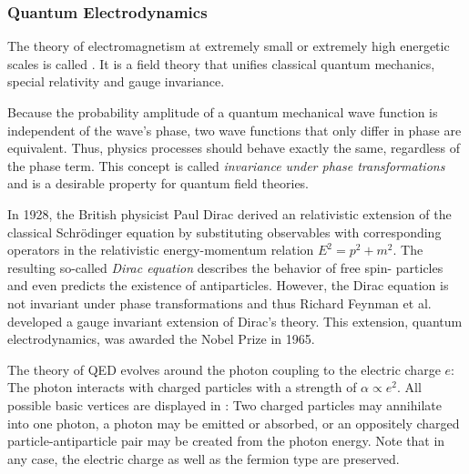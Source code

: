 \subsubsection{Quantum Electrodynamics}
The theory of electromagnetism at extremely small or extremely high energetic scales is called . It is a field theory that unifies classical quantum mechanics, special relativity and gauge invariance.

Because the probability amplitude of a quantum mechanical wave function is independent of the wave's phase, two wave functions that only differ in phase are equivalent. Thus, physics processes should behave exactly the same, regardless of the phase term. This concept is called \emph{invariance under phase transformations} and is a desirable property for quantum field theories.

In 1928, the British physicist Paul Dirac derived an relativistic extension of the classical Schrödinger equation\cite{Dirac:quantumtheoryelectron} by substituting observables with corresponding operators in the relativistic energy-momentum relation $E^2 = p^2 + m^2$. The resulting so-called \emph{Dirac equation} describes the behavior of free spin- particles and even predicts the existence of antiparticles.
However, the Dirac equation is not invariant under phase transformations and thus Richard Feynman et al. developed a gauge invariant extension of Dirac's theory\cite{Feynman:Spacetimeapproach}. This extension, quantum electrodynamics, was awarded the Nobel Prize in 1965\cite{NobelMedia:NobelPrize1965}.

The theory of \ac{QED} evolves around the photon coupling to the electric charge $e$: The photon interacts with charged particles with a strength of $\alpha \propto e^2$.
All possible basic vertices are displayed in : Two charged particles may annihilate into one photon, a photon may be emitted or absorbed, or an oppositely charged particle-antiparticle pair may be created from the photon energy. Note that in any case, the electric charge as well as the fermion type are preserved.


